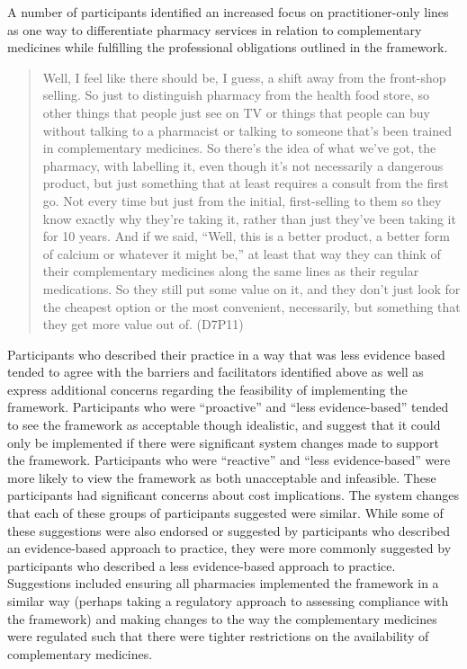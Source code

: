 \documentclass[11pt,a4paper]{article}
\begin{document}
A number of participants identified an increased focus on
practitioner-only lines as one way to differentiate pharmacy services in
relation to complementary medicines while fulfilling the professional
obligations outlined in the framework.

\begin{quote}
Well, I feel like there should be, I guess, a shift away from the
front-shop selling. So just to distinguish pharmacy from the health food
store, so other things that people just see on TV or things that people
can buy without talking to a pharmacist or talking to someone that's
been trained in complementary medicines. So there's the idea of what
we've got, the pharmacy, with labelling it, even though it's not
necessarily a dangerous product, but just something that at least
requires a consult from the first go. Not every time but just from the
initial, first-selling to them so they know exactly why they're taking
it, rather than just they've been taking it for 10 years. And if we
said, ``Well, this is a better product, a better form of calcium or
whatever it might be,'' at least that way they can think of their
complementary medicines along the same lines as their regular
medications. So they still put some value on it, and they don't just
look for the cheapest option or the most convenient, necessarily, but
something that they get more value out of. (D7P11)
\end{quote}

Participants who described their practice in a way that was less
evidence based tended to agree with the barriers and facilitators
identified above as well as express additional concerns regarding the
feasibility of implementing the framework. Participants who were
``proactive'' and ``less evidence-based'' tended to see the framework as
acceptable though idealistic, and suggest that it could only be
implemented if there were significant system changes made to support the
framework. Participants who were ``reactive'' and ``less
evidence-based'' were more likely to view the framework as both
unacceptable and infeasible. These participants had significant concerns
about cost implications. The system changes that each of these groups of
participants suggested were similar. While some of these suggestions
were also endorsed or suggested by participants who described an
evidence-based approach to practice, they were more commonly suggested
by participants who described a less evidence-based approach to
practice. Suggestions included ensuring all pharmacies implemented the
framework in a similar way (perhaps taking a regulatory approach to
assessing compliance with the framework) and making changes to the way
the complementary medicines were regulated such that there were tighter
restrictions on the availability of complementary medicines.
\end{document}

